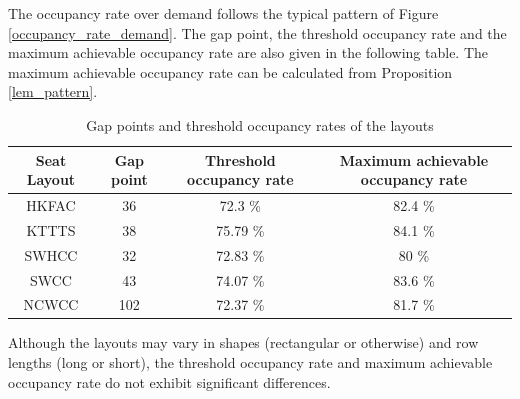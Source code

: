 The occupancy rate over demand follows the typical pattern of Figure \ref{occupancy_rate_demand}. The gap point, the threshold occupancy rate and the maximum achievable occupancy rate are also given in the following table. The maximum achievable occupancy rate can be calculated from Proposition \ref{lem_pattern}.

\begin{table}[ht]
  \centering
  \caption{Gap points and threshold occupancy rates of the layouts}
  \begin{tabular}{c|ccc}
  \hline
   Seat Layout & Gap point & Threshold occupancy rate & Maximum achievable occupancy rate \\
  \hline
   HKFAC & 36 & 72.3 \% & 82.4 \% \\
   KTTTS & 38 & 75.79 \% & 84.1 \% \\
   SWHCC & 32 & 72.83 \% & 80 \% \\
   SWCC & 43 & 74.07 \%  & 83.6 \% \\
   NCWCC & 102 & 72.37 \% & 81.7 \% \\
   \hline
  \end{tabular}
\end{table}



Although the layouts may vary in shapes (rectangular or otherwise) and row lengths (long or short), the threshold occupancy rate and maximum achievable occupancy rate do not exhibit significant differences.



